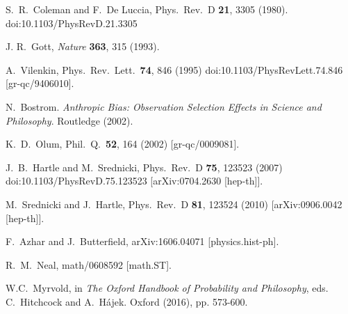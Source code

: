 \documentclass[12pt,letterpaper]{article}
\begin{document}
\begin{thebibliography}{999}
  S.~R.~Coleman and F.~De Luccia,
  Phys.\ Rev.\ D {\bf 21}, 3305 (1980).
  doi:10.1103/PhysRevD.21.3305
  
J. R.\ Gott, \emph{Nature} {\bf 363}, 315 (1993).

  A.~Vilenkin,
  Phys.\ Rev.\ Lett.\  {\bf 74}, 846 (1995)
  doi:10.1103/PhysRevLett.74.846
  [gr-qc/9406010].

N.\ Bostrom. \emph{Anthropic Bias: Observation Selection Effects in Science and Philosophy}. Routledge (2002).

  K.~D.~Olum,
  Phil.\ Q.\  {\bf 52}, 164 (2002)
  [gr-qc/0009081].

  J.~B.~Hartle and M.~Srednicki,
  Phys.\ Rev.\ D {\bf 75}, 123523 (2007)
  doi:10.1103/PhysRevD.75.123523
  [arXiv:0704.2630 [hep-th]].
    
  M.~Srednicki and J.~Hartle,
  Phys.\ Rev.\ D {\bf 81}, 123524 (2010)
  [arXiv:0906.0042 [hep-th]].

  F.~Azhar and J.~Butterfield,
  arXiv:1606.04071 [physics.hist-ph].
  
  R.~M.~Neal,
  math/0608592 [math.ST].
  
  W.C.\ Myrvold, in \emph{The Oxford Handbook of Probability and Philosophy}, eds. C.~Hitchcock and A.~H\'ajek. Oxford (2016), pp. 573-600.



\end{thebibliography}
\end{document}
